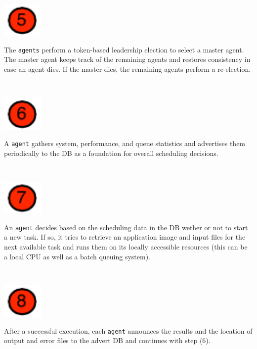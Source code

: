 \documentclass[a0b,portrait]{a0poster}
\begin{document}
\begin{textblock}{7}
\begin{minipage}{1in}\includegraphics[width=20mm]{bullet_05}\end{minipage}
\begin{minipage}{13.35in}
  The \texttt{agents} perform a token-based leadership election to select
  a master agent. The master agent keeps track of the remaining agents and 
  restores consistency in case an agent dies. If the master dies, the 
  remaining agents perform a re-election.
\end{minipage}\\[.3em]

\begin{minipage}{1in}\includegraphics[width=20mm]{bullet_06}\end{minipage}
\begin{minipage}{13.35in}
  A \texttt{agent} gathers system, performance, and queue statistics and 
  advertises them periodically to the DB as a foundation for overall scheduling 
  decisions.
\end{minipage}\\

\begin{minipage}{1in}\includegraphics[width=20mm]{bullet_07}\end{minipage}
\begin{minipage}{13.35in}
  An \texttt{agent} decides based on the scheduling data in the DB wether or 
  not to start a new task. If so, it tries to retrieve an application image 
  and input files for the next available task and runs them on its locally
  accessible resources (this can be a local CPU as well as a batch queuing system).
\end{minipage}\\[.3em]

\begin{minipage}{1in}\includegraphics[width=20mm]{bullet_08}\end{minipage}
\begin{minipage}{13.35in}
  After a successful execution, each \texttt{agent} announces the results 
  and the location of output and error files to the advert DB and continues 
  with step (6).
\end{minipage}\\

\end{textblock}
\end{document}
